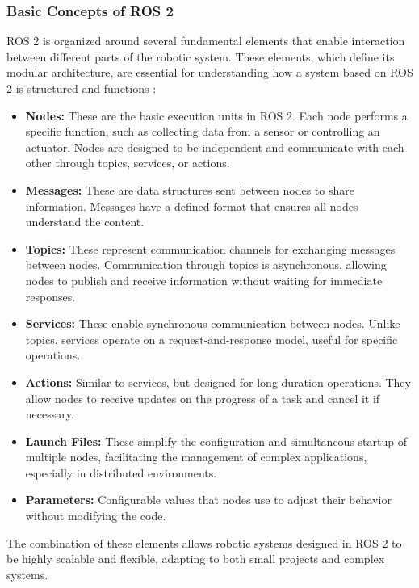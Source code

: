     \subsubsection{Basic Concepts of ROS 2}
    
    ROS 2 is organized around several fundamental elements that enable interaction between different parts of the robotic system. These elements, which define its modular architecture, are essential for understanding how a system based on ROS 2 is structured and functions \cite{ros_docs}:  
    
    \begin{itemize}
        \item \textbf{Nodes:} These are the basic execution units in ROS 2. Each node performs a specific function, such as collecting data from a sensor or controlling an actuator. Nodes are designed to be independent and communicate with each other through topics, services, or actions.  
        \item \textbf{Messages:} These are data structures sent between nodes to share information. Messages have a defined format that ensures all nodes understand the content.  
        \item \textbf{Topics:} These represent communication channels for exchanging messages between nodes. Communication through topics is asynchronous, allowing nodes to publish and receive information without waiting for immediate responses.  
        \item \textbf{Services:} These enable synchronous communication between nodes. Unlike topics, services operate on a request-and-response model, useful for specific operations.  
        \item \textbf{Actions:} Similar to services, but designed for long-duration operations. They allow nodes to receive updates on the progress of a task and cancel it if necessary.  
        \item \textbf{Launch Files:} These simplify the configuration and simultaneous startup of multiple nodes, facilitating the management of complex applications, especially in distributed environments.  
        \item \textbf{Parameters:} Configurable values that nodes use to adjust their behavior without modifying the code.  
    \end{itemize}
    
    The combination of these elements allows robotic systems designed in ROS 2 to be highly scalable and flexible, adapting to both small projects and complex systems.  
    
